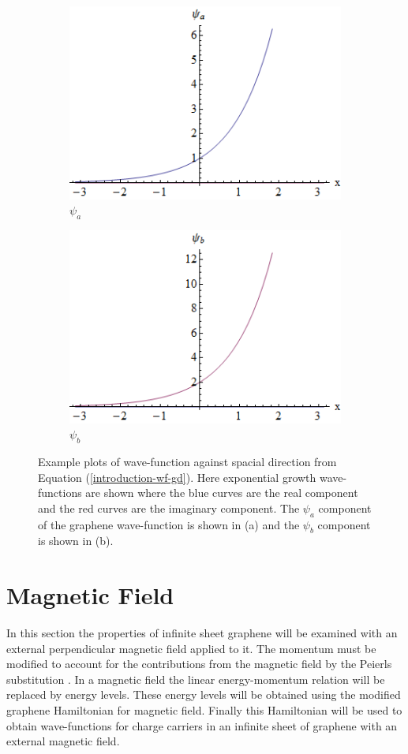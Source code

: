 \begin{figure}
	\begin{subfigure}{0.45\textwidth}
		\centerline{\includegraphics[scale=0.6]{images/growth-psi-a}}
		\caption{$\psi_{a}$}
		\label{}
	\end{subfigure}
	\hspace{1.2cm}
	\begin{subfigure}{0.45\textwidth}
		\centerline{\includegraphics[scale=0.6]{images/growth-psi-b}}
		\caption{$\psi_{b}$}
		\label{}
	\end{subfigure}
	\caption{Example plots of wave-function against spacial direction from Equation (\ref{introduction-wf-gd}). Here exponential growth wave-functions are shown where the blue curves are the real component and the red curves are the imaginary component. The $\psi_{a}$ component of the graphene wave-function is shown in (a) and the $\psi_{b}$ component is shown in (b).}
	\label{growth-psi-a}
\end{figure}
	\section{Magnetic Field}
		\label{Introduction - Magnetic Field}
		In this section the properties of infinite sheet graphene will be examined with an external perpendicular magnetic field applied to it. The momentum must be modified to account for the contributions from the magnetic field by the Peierls substitution \cite{b39}. In a magnetic field the linear energy-momentum relation will be replaced by energy levels. These energy levels will be obtained using the modified graphene Hamiltonian for magnetic field. Finally this Hamiltonian will be used to obtain wave-functions for charge carriers in an infinite sheet of graphene with an external magnetic field.
